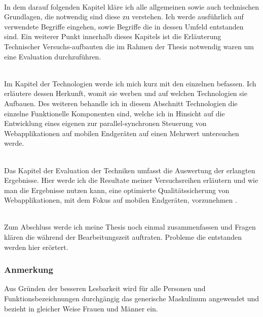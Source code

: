 \\In dem darauf folgenden Kapitel kläre ich alle allgemeinen sowie auch technischen Grundlagen, die notwendig sind diese  zu verstehen. Ich werde ausführlich auf verwendete Begriffe eingehen, sowie Begriffe die in dessen Umfeld entstanden sind. Ein weiterer Punkt innerhalb dieses Kapitels ist die Erläuterung Technischer Versuchs-aufbauten die im Rahmen der Thesis notwendig waren um eine Evaluation durchzuführen.

\\Im Kapitel der Technologien werde ich mich kurz mit den einzelnen  befassen. Ich erläutere dessen Herkunft, womit sie werben und auf welchen Technologien sie Aufbauen. Des weiteren behandle ich in diesem Abschnitt Technologien die einzelne Funktionelle Komponenten sind, welche ich in Hinsicht auf die Entwicklung eines eigenen  zur parallel-synchronen Steuerung von Webapplikationen auf mobilen Endgeräten auf einen Mehrwert untersuchen werde.

\\Das Kapitel der Evaluation der Techniken umfasst die Auswertung der erlangten Ergebnisse. Hier werde ich die Resultate meiner Versuchsreihen erläutern und wie man die Ergebnisse nutzen kann, eine optimierte Qualitätssicherung von Webapplikationen, mit dem Fokus auf mobilen Endgeräten, vorzunehmen .

\\Zum Abschluss werde ich meine Thesis noch einmal zusammenfassen und Fragen klären die während der Bearbeitungszeit auftraten. Probleme die entstanden werden hier erörtert.

\vfill
\subsubsection{Anmerkung}
Aus Gründen der besseren Lesbarkeit wird für alle Personen und Funktionsbezeichnungen durchgängig das generische Maskulinum angewendet und bezieht in gleicher Weise Frauen und Männer ein.